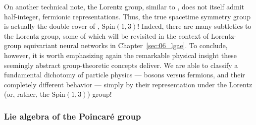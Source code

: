 On another technical note, the Lorentz group, similar to \SO[3], does not itself admit half-integer, fermionic representations.
Thus, the true spacetime symmetry group is actually the double cover of \SO[1, 3], $\mathrm{Spin}(1,3)$!
Indeed, there are many subtleties to the Lorentz group, some of which will be revisited in the context of Lorentz-group equivariant neural networks in Chapter~\ref{sec:06_lgae}.
To conclude, however, it is worth emphasizing again the remarkable physical insight these seemingly abstract group-theoretic concepts deliver.
We are able to classify a fundamental dichotomy of particle physics --- bosons versus fermions, and their completely different behavior --- simply by their representation under the Lorentz (or, rather, the $\mathrm{Spin}(1,3)$) group!

\begin{table}[ht!]
	\centering
	\caption{Representations of the Lorentz group and their associated particle fields in the SM.}
	\renewcommand{\arraystretch}{1.5}
	\label{tab:01_lorentz_representations}
\end{table}


\subsubsection{Lie algebra of the Poincaré group}

